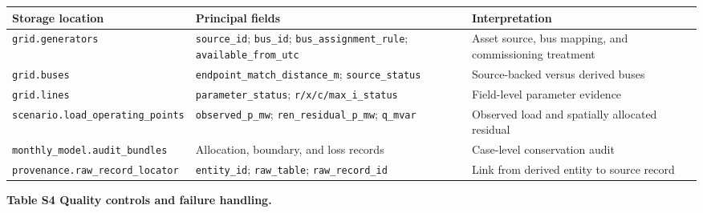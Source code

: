 \documentclass[
  10pt]{article}
\begin{document}
\begin{longtable}[]{@{}
  >{\raggedright\arraybackslash}p{}
  >{\raggedright\arraybackslash}p{}
  >{\raggedright\arraybackslash}p{}@{}}
\toprule\noalign{}
\begin{minipage}[b]{\linewidth}\raggedright
Storage location
\end{minipage} & \begin{minipage}[b]{\linewidth}\raggedright
Principal fields
\end{minipage} & \begin{minipage}[b]{\linewidth}\raggedright
Interpretation
\end{minipage} \\
\midrule\noalign{}
\endhead
\bottomrule\noalign{}
\endlastfoot
\texttt{grid.generators} & \texttt{source\_id}; \texttt{bus\_id};
\texttt{bus\_assignment\_rule}; \texttt{available\_from\_utc} & Asset
source, bus mapping, and commissioning treatment \\
\texttt{grid.buses} & \texttt{endpoint\_match\_distance\_m};
\texttt{source\_status} & Source-backed versus derived buses \\
\texttt{grid.lines} & \texttt{parameter\_status};
\texttt{r/x/c/max\_i\_status} & Field-level parameter evidence \\
\texttt{scenario.load\_operating\_points} & \texttt{observed\_p\_mw};
\texttt{ren\_residual\_p\_mw}; \texttt{q\_mvar} & Observed load and
spatially allocated residual \\
\texttt{monthly\_model.audit\_bundles} & Allocation, boundary, and loss
records & Case-level conservation audit \\
\texttt{provenance.raw\_record\_locator} & \texttt{entity\_id};
\texttt{raw\_table}; \texttt{raw\_record\_id} & Link from derived entity
to source record \\
\end{longtable}

\textbf{Table S4 \textbar{} Quality controls and failure handling.}
\end{document}
